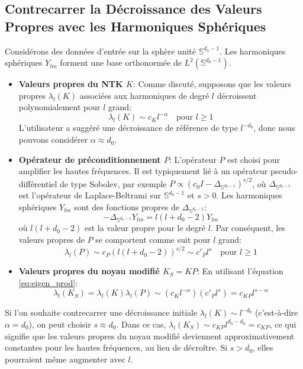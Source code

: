 \documentclass{article}
\newcommand{\LaplaceBeltrami}{\Delta_{\mathbb{S}^{d_0-1}}}
\begin{document}
\subsection{Contrecarrer la Décroissance des Valeurs Propres avec les Harmoniques Sphériques}
Considérons des données d'entrée sur la sphère unité $\mathbb{S}^{d_0-1}$. Les harmoniques sphériques $Y_{lm}$ forment une base orthonormée de $L^2(\mathbb{S}^{d_0-1})$.
\begin{itemize}
    \item \textbf{Valeurs propres du NTK $K$}: Comme discuté, supposons que les valeurs propres $\lambda_l(K)$ associées aux harmoniques de degré $l$ décroissent polynomialement pour $l$ grand:
    \begin{equation}
        \lambda_l(K) \sim c_K l^{-\alpha} \quad \text{pour } l \ge 1
    \end{equation}
    L'utilisateur a suggéré une décroissance de référence de type $l^{-d_0}$, donc nous pouvons considérer $\alpha \approx d_0$.

    \item \textbf{Opérateur de préconditionnement $P$}: L'opérateur $P$ est choisi pour amplifier les hautes fréquences. Il est typiquement lié à un opérateur pseudo-différentiel de type Sobolev, par exemple $P \propto (c_0 I - \LaplaceBeltrami)^{s/2}$, où $\LaplaceBeltrami$ est l'opérateur de Laplace-Beltrami sur $\mathbb{S}^{d_0-1}$ et $s > 0$. Les harmoniques sphériques $Y_{lm}$ sont des fonctions propres de $\LaplaceBeltrami$:
    \begin{equation*}
        -\LaplaceBeltrami Y_{lm} = l(l+d_0-2) Y_{lm}
    \end{equation*}
    où $l(l+d_0-2)$ est la valeur propre pour le degré $l$.
    Par conséquent, les valeurs propres de $P$ se comportent comme suit pour $l$ grand:
    \begin{equation}
        \lambda_l(P) \sim c_P (l(l+d_0-2))^{s/2} \sim c'_P l^s \quad \text{pour } l \ge 1
    \end{equation}

    \item \textbf{Valeurs propres du noyau modifié $K_S = KP$}: En utilisant l'équation \eqref{eq:eigen_prod}:
    \begin{equation}
        \lambda_l(K_S) = \lambda_l(K) \lambda_l(P) \sim (c_K l^{-\alpha}) (c'_P l^s) = c_{KP} l^{s-\alpha}
        \label{eq:modified_decay}
    \end{equation}
\end{itemize}
Si l'on souhaite contrecarrer une décroissance initiale $\lambda_l(K) \sim l^{-d_0}$ (c'est-à-dire $\alpha = d_0$), on peut choisir $s \approx d_0$. Dans ce cas, $\lambda_l(K_S) \sim c_{KP} l^{d_0-d_0} = c_{KP}$, ce qui signifie que les valeurs propres du noyau modifié deviennent approximativement constantes pour les hautes fréquences, au lieu de décroître. Si $s > d_0$, elles pourraient même augmenter avec $l$.
\end{document}
